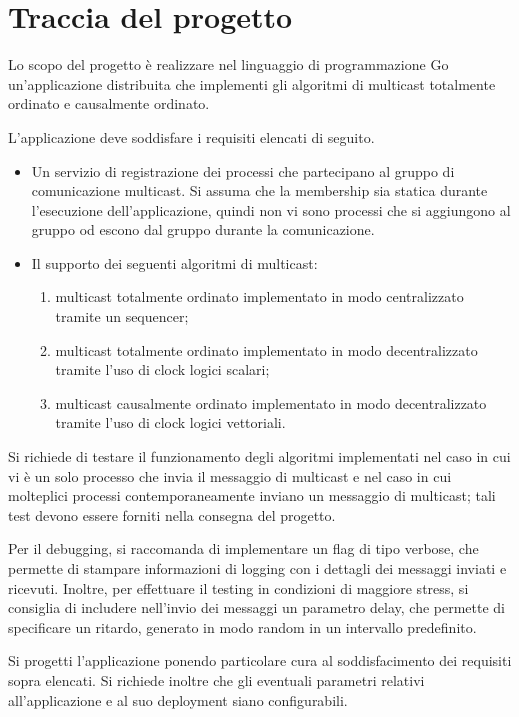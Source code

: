 \documentclass[acmtog]{acmart}
\begin{document}
\section{Traccia del progetto}
Lo scopo del progetto è realizzare nel linguaggio di programmazione Go un'applicazione distribuita che implementi gli algoritmi di multicast totalmente ordinato e causalmente ordinato.

L'applicazione deve soddisfare i requisiti elencati di seguito.
\begin{itemize}
\item Un servizio di registrazione dei processi che partecipano al gruppo di comunicazione multicast. Si assuma che la membership sia statica durante l'esecuzione dell'applicazione, quindi non vi sono processi che si aggiungono al gruppo od escono dal gruppo durante la comunicazione.
\item Il supporto dei seguenti algoritmi di multicast:
\begin{enumerate}
\item multicast totalmente ordinato implementato in modo centralizzato tramite un sequencer;
\item multicast totalmente ordinato implementato in modo decentralizzato tramite l’uso di clock logici scalari;
\item multicast causalmente ordinato implementato in modo decentralizzato tramite l’uso di clock logici vettoriali.
\end{enumerate}
\end{itemize}
Si richiede di testare il funzionamento degli algoritmi implementati nel caso in cui vi è un solo processo che invia il messaggio di multicast e nel caso in cui molteplici processi contemporaneamente inviano un messaggio di multicast; tali test devono essere forniti nella consegna del progetto.

Per il debugging, si raccomanda di implementare un flag di tipo verbose, che permette di stampare informazioni di logging con i dettagli dei messaggi inviati e ricevuti. Inoltre, per effettuare il testing in condizioni di maggiore stress, si consiglia di includere nell’invio dei messaggi un parametro delay, che permette di specificare un ritardo, generato in modo random in un intervallo predefinito.

Si progetti l'applicazione ponendo particolare cura al soddisfacimento dei requisiti sopra elencati. Si richiede inoltre che gli eventuali parametri relativi all'applicazione e al suo deployment siano configurabili.
\end{document}
